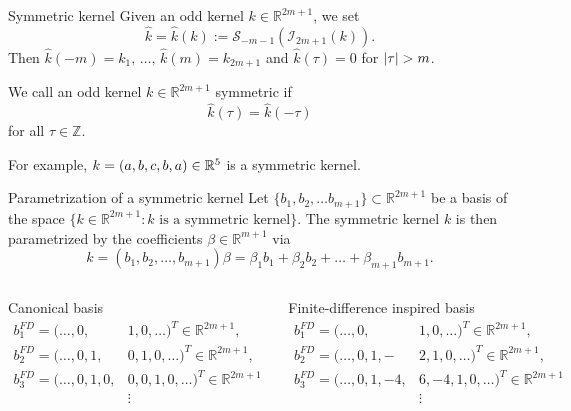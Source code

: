 \begin{frame}{Symmetric kernel}
  Given an odd kernel $k \in \mathbb{R}^{2m+1}$, we set
  \begin{equation*}
    \hat{k} = \hat{k}(k) := \mathcal{S}_{-m-1}(\mathcal{I}_{2m+1}(k))
    .
  \end{equation*}
  Then $\hat{k}(-m) = k_1, \, \dots,\, \hat{k}(m) = k_{2m+1}$ and
  $\hat{k}(\tau)=0$ for $\left|{\tau}\right| > m$.
  \begin{definition}
    We call an odd kernel $k \in \mathbb{R}^{2m+1}$ symmetric if
    \begin{equation*}
      \hat{k}(\tau) = \hat{k}(-\tau)
    \end{equation*}
    for all $\tau \in \mathbb{Z}$.
  \end{definition}

  For example, $k = (a,b,c,b,a) \in \mathbb{R}^5$ is a symmetric kernel.
\end{frame}

\begin{frame}{Parametrization of a symmetric kernel}
  Let $\{b_1, b_2, \dots b_{m+1} \} \subset \mathbb{R}^{2m+1}$ be a basis of the space 
  $\{ k \in \mathbb{R}^{2m+1} : k \text{ is a symmetric kernel} \}$.
  The symmetric kernel $k$ is then parametrized by the coefficients $\beta \in \mathbb{R}^{m+1}$ via
  \begin{equation*}
    k = (b_1, b_2, \dots, b_{m+1}) \beta = \beta_1 b_1 + \beta_2 b_2 + \dots + \beta_{m+1} b_{m+1}
    .
  \end{equation*}

  \vspace{0.3cm}
  \begin{columns}
    \centering
    Canonical basis
    \begin{align*}
      b_1^{FD} = (\dots, 0,& 1,0, \dots)^T \in \mathbb{R}^{2m+1},\\
      b_2^{FD} = (\dots, 0, 1,&0,1, 0, \dots)^T \in \mathbb{R}^{2m+1},\\
      b_3^{FD} = (\dots, 0, 1,0,& 0,0,1, 0, \dots)^T \in \mathbb{R}^{2m+1} \\
      &\vdots
    \end{align*}

    \centering
    Finite-difference inspired basis
    \begin{align*}
      b_1^{FD} = (\dots, 0,& 1,0, \dots)^T \in \mathbb{R}^{2m+1},\\
      b_2^{FD} = (\dots, 0, 1,-&2,1, 0, \dots)^T \in \mathbb{R}^{2m+1},\\
      b_3^{FD} = (\dots, 0, 1,-4,& 6,-4,1, 0, \dots)^T \in \mathbb{R}^{2m+1} \\
      &\vdots
    \end{align*}
  \end{columns}
\end{frame}

